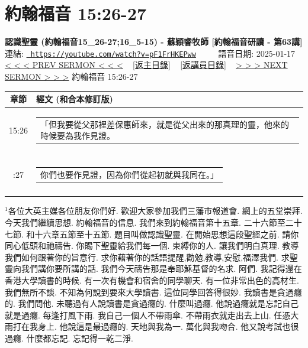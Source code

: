 \documentclass{book}
\begin{document}
\section{約翰福音 15:26-27}
\label{sec:pF1FrHKEPww}
\textbf{認識聖靈 (約翰福音15\_26-27;16\_5-15) - 蘇穎睿牧師 [約翰福音研讀 - 第63講]}
\newline
\newline
連結: \href{https://youtube.com/watch?v=pF1FrHKEPww}{\texttt{ https://youtube.com/watch?v=pF1FrHKEPww}} ~~~~ 語音日期: 2025-01-17 
\newline
\newline
\hyperref[sec:GDV7iT9TooA]{< < < PREV SERMON < < <}
~
\hyperlink{toc}{[返主目錄]}
~
\hyperref[ch:preacher9]{[返講員目錄]}
~
\hyperref[sec:M4alGuubf1o]{> > > NEXT SERMON > > >}
\newline
\newline
約翰福音 15:26-27
\newline
\begin{longtable}{cl}
\hline
\hline
章節 & 經文 (和合本修訂版)\\
\hline
15:26 & \begin{tabularx}{0.7\textwidth}{X} 「但我要從父那裡差保惠師來，就是從父出來的那真理的靈，他來的時候要為我作見證。 \end{tabularx} \\ \\ \relax
15:27 & \begin{tabularx}{0.7\textwidth}{X} 你們也要作見證，因為你們從起初就與我同在。」 \end{tabularx} \\ \\
[1ex]
\hline
\hline
\end{longtable}
$^{1}$各位大英主媒各位朋友你們好.
歡迎大家參加我們三藩市報道會.
網上的五堂崇拜.
今天我們繼續思想.
約翰福音的信息.
我們來到約翰福音第十五章.
二十六節至二十七節.
和十六章五節至十五節.
題目叫做認識聖靈.
在開始思想這段聖經之前.
請你同心低頭和祂禱告.
你賜下聖靈給我們每一個.
束縛你的人.
讓我們明白真理.
教導我們如何跟著你的旨意行.
求你藉著你的話語提醒,勸勉,教導,安慰,福澤我們.
求聖靈向我們講你要所講的話.
我們今天禱告那是奉耶穌基督的名求.
阿們.
我記得還在香港大學讀書的時候.
有一次有機會和宿舍的同學聊天.
有一位非常出色的高材生.
我們無所不談.
不知為何說到要來大學讀書.
這位同學回答得很妙.
我讀書是貪過癮的.
我們問他.
未聽過有人說讀書是貪過癮的.
什麼叫過癮.
他說過癮就是忘記自己就是過癮.
每逢打風下雨.
我自己一個人不帶雨傘.
不帶雨衣就走出去上山.
任憑大雨打在我身上.
他說這是最過癮的.
天地與我為一.
萬化與我吻合.
他又說考試也很過癮.
什麼都忘記.
忘記得一乾二淨.
\end{document}
